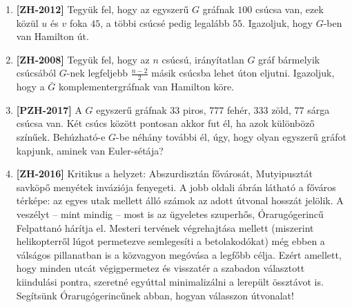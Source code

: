 \documentclass[a4paper,12pt]{article}
\begin{document}
\begin{enumerate}
            \item \textbf{[ZH-2012]} Tegyük fel, hogy az egyszerű $G$ gráfnak $100$ csúcsa van, ezek közül $u$ és $v$ foka $45$, a többi csúcsé pedig legalább $55$. Igazoljuk, hogy $G$-ben van Hamilton út.

            \item \textbf{[ZH-2008]} Tegyük fel, hogy az $n$ csúcsú, irányítatlan $G$ gráf bármelyik csúcsából $G$-nek legfeljebb $\frac{n-2}{2}$ másik csúcsba lehet úton eljutni. Igazoljuk, hogy a $\bar{G}$ komplementergráfnak van Hamilton köre.

            \item \textbf{[PZH-2017]} A $G$ egyszerű gráfnak $33$ piros, $777$ fehér, $333$ zöld, $77$ sárga csúcsa van. Két csúcs között pontosan akkor fut él, ha azok különböző színűek. Behúzható-e $G$-be néhány további él, úgy, hogy olyan egyszerű gráfot kapjunk, aminek van Euler-sétája?

            \item \textbf{[ZH-2016]} Kritikus a helyzet: Abszurdisztán fővárosát, Mutyipusztát savköpő menyétek inváziója fenyegeti. A jobb oldali ábrán látható a főváros térképe: az egyes utak mellett álló számok az adott útvonal hosszát jelölik. A veszélyt -- mint mindig -- most is az ügyeletes szuperhős, Órarugógerincű Felpattanó hárítja el. Mesteri tervének végrehajtása mellett (miszerint helikopterről lúgot permetezve semlegesíti a betolakodókat) még ebben a válságos pillanatban is a közvagyon megóvása a legfőbb célja. Ezért amellett, hogy minden utcát végigpermetez és visszatér a szabadon választott kiindulási pontra, szeretné egyúttal minimalizálni a lerepült össztávot is. Segítsünk Órarugógerincűnek abban, hogyan válasszon útvonalat!
            \begin{figure}[h]
                \centering
                
            \end{figure}

        \end{enumerate}
    
\end{document}

